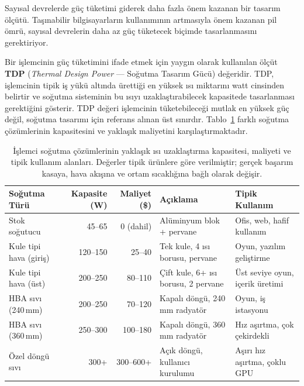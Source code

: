Sayısal devrelerde güç tüketimi giderek daha fazla önem kazanan bir tasarım ölçütü. Taşınabilir bilgisayarların kullanımının artmasıyla önem kazanan pil ömrü, sayısal devrelerin daha az güç tüketecek biçimde tasarlanmasını gerektiriyor.

Bir işlemcinin güç tüketimini ifade etmek için yaygın olarak kullanılan ölçüt \textbf{TDP} (\emph{Thermal Design Power} --- Soğutma Tasarım Gücü) değeridir. TDP, işlemcinin tipik iş yükü altında ürettiği en yüksek ısı miktarını watt cinsinden belirtir ve soğutma sisteminin bu ısıyı uzaklaştırabilecek kapasitede tasarlanması gerektiğini gösterir. TDP değeri işlemcinin tüketebileceği mutlak en yüksek güç değil, soğutma tasarımı için referans alınan üst sınırdır. Tablo~\ref{tab:sogutma-sistemleri} farklı soğutma çözümlerinin kapasitesini ve yaklaşık maliyetini karşılaştırmaktadır.

\begin{table}[ht!]
\centering
\caption[Soğutma çözümlerinin TDP kapasitesi ve maliyeti]{İşlemci soğutma çözümlerinin yaklaşık ısı uzaklaştırma kapasitesi, maliyeti ve tipik kullanım alanları. Değerler tipik ürünlere göre verilmiştir; gerçek başarım kasaya, hava akışına ve ortam sıcaklığına bağlı olarak değişir.}
\label{tab:sogutma-sistemleri}
\footnotesize
\begin{tabular}{lrrp{3.6cm}p{3.2cm}}
\toprule
\textbf{Soğutma Türü} & \textbf{Kapasite (W)} & \textbf{Maliyet (\$)} & \textbf{Açıklama} & \textbf{Tipik Kullanım} \\
\midrule
Stok soğutucu          & 45--65    & 0 (dahil)    & Alüminyum blok + pervane & Ofis, web, hafif kullanım \\
Kule tipi hava (giriş) & 120--150  & 25--40       & Tek kule, 4 ısı borusu, pervane & Oyun, yazılım geliştirme \\
Kule tipi hava (üst)   & 200--250  & 80--110      & Çift kule, 6+ ısı borusu, 2 pervane & Üst seviye oyun, içerik üretimi \\
HBA sıvı (240\,mm)     & 200--250  & 70--120      & Kapalı döngü, 240\,mm radyatör & Oyun, iş istasyonu \\
HBA sıvı (360\,mm)     & 250--300  & 100--180     & Kapalı döngü, 360\,mm radyatör & Hız aşırtma, çok çekirdekli \\
Özel döngü sıvı        & 300+      & 300--600+    & Açık döngü, kullanıcı kurulumu & Aşırı hız aşırtma, çoklu GPU \\
\bottomrule
\end{tabular}
\end{table}

